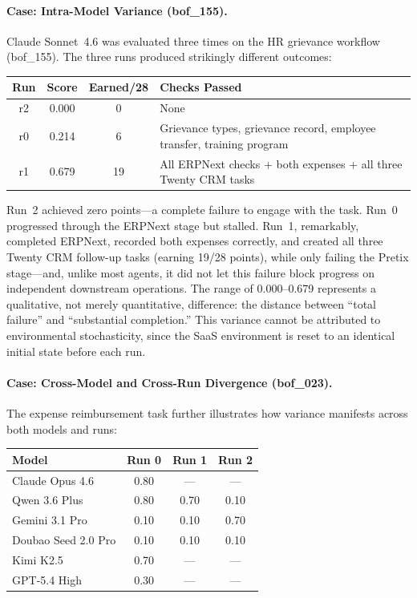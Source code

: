 \paragraph{Case: Intra-Model Variance ({\ttfamily bof\_155}).}
Claude Sonnet~4.6 was evaluated three times on the HR grievance workflow ({\ttfamily bof\_155}). The three runs produced strikingly different outcomes:

\begin{table}[h]
\centering
\small
\renewcommand{\arraystretch}{1.1}
\begin{tabular}{cccp{7cm}}
\toprule
\textbf{Run} & \textbf{Score} & \textbf{Earned/28} & \textbf{Checks Passed} \\
\midrule
r2 & 0.000 & 0 & None \\
r0 & 0.214 & 6 & Grievance types, grievance record, employee transfer, training program \\
r1 & 0.679 & 19 & All ERPNext checks + both expenses + all three Twenty CRM tasks \\
\bottomrule
\end{tabular}
\end{table}

Run~2 achieved zero points---a complete failure to engage with the task. Run~0 progressed through the ERPNext stage but stalled. Run~1, remarkably, completed ERPNext, recorded both expenses correctly, and created all three Twenty CRM follow-up tasks (earning 19/28 points), while only failing the Pretix stage---and, unlike most agents, it did not let this failure block progress on independent downstream operations. The range of 0.000--0.679 represents a qualitative, not merely quantitative, difference: the distance between ``total failure'' and ``substantial completion.'' This variance cannot be attributed to environmental stochasticity, since the SaaS environment is reset to an identical initial state before each run.

\paragraph{Case: Cross-Model and Cross-Run Divergence ({\ttfamily bof\_023}).}
The expense reimbursement task further illustrates how variance manifests across both models and runs:

\begin{table}[h]
\centering
\small
\renewcommand{\arraystretch}{1.1}
\begin{tabular}{lccc}
\toprule
\textbf{Model} & \textbf{Run 0} & \textbf{Run 1} & \textbf{Run 2} \\
\midrule
Claude Opus 4.6 & 0.80 & --- & --- \\
Qwen 3.6 Plus & 0.80 & 0.70 & 0.10 \\
Gemini 3.1 Pro & 0.10 & 0.10 & 0.70 \\
Doubao Seed 2.0 Pro & 0.10 & 0.10 & 0.10 \\
Kimi K2.5 & 0.70 & --- & --- \\
GPT-5.4 High & 0.30 & --- & --- \\
\bottomrule
\end{tabular}
\end{table}

